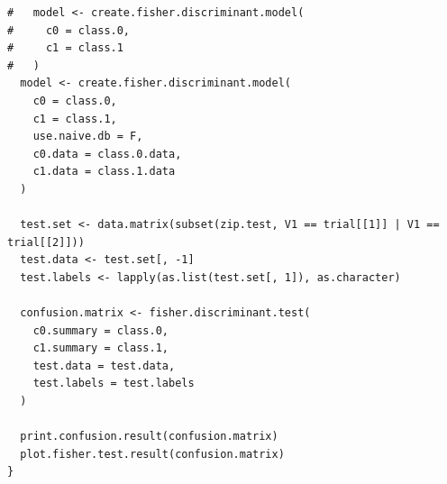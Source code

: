 \documentclass{article}
\begin{document}
\begin{verbatim}
#   model <- create.fisher.discriminant.model(
#     c0 = class.0,
#     c1 = class.1
#   )
  model <- create.fisher.discriminant.model(
    c0 = class.0,
    c1 = class.1,
    use.naive.db = F,
    c0.data = class.0.data,
    c1.data = class.1.data
  )

  test.set <- data.matrix(subset(zip.test, V1 == trial[[1]] | V1 == trial[[2]]))
  test.data <- test.set[, -1]
  test.labels <- lapply(as.list(test.set[, 1]), as.character)

  confusion.matrix <- fisher.discriminant.test(
    c0.summary = class.0,
    c1.summary = class.1,
    test.data = test.data,
    test.labels = test.labels
  )

  print.confusion.result(confusion.matrix)
  plot.fisher.test.result(confusion.matrix)
}
\end{verbatim}
\end{document}
